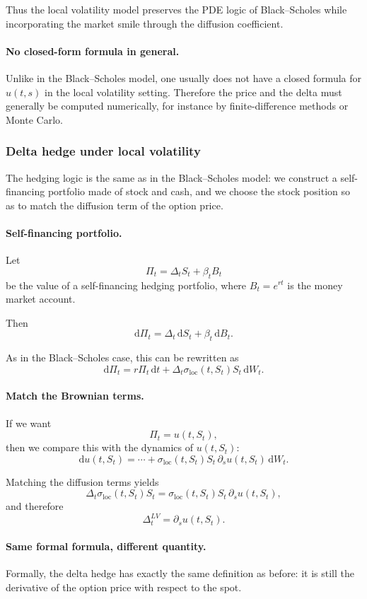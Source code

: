 \documentclass[11pt]{article}
\theoremstyle{plain}
\theoremstyle{definition}
\theoremstyle{remark}
\begin{document}
Thus the local volatility model preserves the PDE logic of
Black--Scholes while incorporating the market smile through the diffusion
coefficient.

\paragraph{No closed-form formula in general.}
Unlike in the Black--Scholes model, one usually does not have a closed
formula for \(u(t,s)\) in the local volatility setting.
Therefore the price and the delta must generally be computed
numerically, for instance by finite-difference methods or Monte Carlo.

\subsubsection{Delta hedge under local volatility}

The hedging logic is the same as in the Black--Scholes model:
we construct a self-financing portfolio made of stock and cash, and we
choose the stock position so as to match the diffusion term of the
option price.

\paragraph{Self-financing portfolio.}
Let
\[
\Pi_t=\Delta_t S_t+\beta_t B_t
\]
be the value of a self-financing hedging portfolio, where \(B_t=e^{rt}\)
is the money market account.

Then
\[
\mathrm{d}\Pi_t=\Delta_t\,\mathrm{d}S_t+\beta_t\,\mathrm{d}B_t.
\]

As in the Black--Scholes case, this can be rewritten as
\[
\mathrm{d}\Pi_t
=
r\Pi_t\,\mathrm{d}t
+
\Delta_t \sigma_{\mathrm{loc}}(t,S_t)S_t\,\mathrm{d}W_t.
\]

\paragraph{Match the Brownian terms.}
If we want
\[
\Pi_t=u(t,S_t),
\]
then we compare this with the dynamics of \(u(t,S_t)\):
\[
\mathrm{d}u(t,S_t)
=
\cdots
+
\sigma_{\mathrm{loc}}(t,S_t)S_t\,\partial_s u(t,S_t)\,\mathrm{d}W_t.
\]

Matching the diffusion terms yields
\[
\Delta_t \sigma_{\mathrm{loc}}(t,S_t)S_t
=
\sigma_{\mathrm{loc}}(t,S_t)S_t\,\partial_s u(t,S_t),
\]
and therefore
\[
\boxed{
\Delta_t^{LV}=\partial_s u(t,S_t).
}
\]

\paragraph{Same formal formula, different quantity.}
Formally, the delta hedge has exactly the same definition as before:
it is still the derivative of the option price with respect to the spot.
\end{document}
